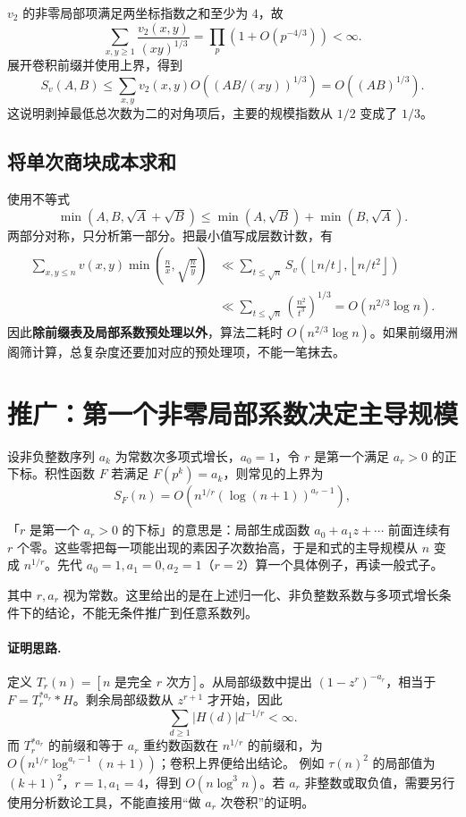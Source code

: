 \documentclass[UTF8,a4paper,11pt,twoside,openright,fontset=fandol]{ctexbook}
\theoremstyle{definition}
\newcommand{\floor}[1]{\left\lfloor #1\right\rfloor}
\begin{document}
$v_2$ 的非零局部项满足两坐标指数之和至少为 $4$，故
\[
 \sum_{x,y\ge1}\frac{v_2(x,y)}{(xy)^{1/3}}
 =\prod_p\left(1+O(p^{-4/3})\right)<\infty.
\]
展开卷积前缀并使用上界，得到
\[
 S_v(A,B)\le\sum_{x,y}v_2(x,y)
 O\!\left((AB/(xy))^{1/3}\right)=O((AB)^{1/3}).
\]
这说明剥掉最低总次数为二的对角项后，主要的规模指数从 $1/2$ 变成了 $1/3$。

\subsection{将单次商块成本求和}
使用不等式
\[
 \min(A,B,\sqrt A+\sqrt B)
 \le\min(A,\sqrt B)+\min(B,\sqrt A).
\]
两部分对称，只分析第一部分。把最小值写成层数计数，有
\[
\begin{aligned}
 \sum_{x,y\le n}v(x,y)\min\left(\frac nx,\sqrt{\frac ny}\right)
 &\ll\sum_{t\le\sqrt n}S_v(\floor{n/t},\floor{n/t^2})\\
 &\ll\sum_{t\le\sqrt n}\left(\frac{n^2}{t^3}\right)^{1/3}
 =O(n^{2/3}\log n).
\end{aligned}
\]
因此\textbf{除前缀表及局部系数预处理以外}，算法二耗时 $O(n^{2/3}\log n)$。如果前缀用洲阁筛计算，总复杂度还要加对应的预处理项，不能一笔抹去。


\section{推广：第一个非零局部系数决定主导规模}
设非负整数序列 $a_k$ 为常数次多项式增长，$a_0=1$，令 $r$ 是第一个满足 $a_r>0$ 的正下标。积性函数 $F$ 若满足 $F(p^k)=a_k$，则常见的上界为
\[
 S_F(n)=O\left(n^{1/r}(\log(n+1))^{a_r-1}\right),
\]

\begin{tip}
「$r$ 是第一个 $a_r>0$ 的下标」的意思是：局部生成函数 $a_0+a_1z+\cdots$ 前面连续有 $r$ 个零。这些零把每一项能出现的素因子次数抬高，于是和式的主导规模从 $n$ 变成 $n^{1/r}$。先代 $a_0=1,a_1=0,a_2=1$（$r=2$）算一个具体例子，再读一般式子。
\end{tip}

其中 $r,a_r$ 视为常数。这里给出的是在上述归一化、非负整数系数与多项式增长条件下的结论，不能无条件推广到任意系数列。

\paragraph{证明思路.} 定义 $T_r(n)=[n\text{ 是完全 }r\text{ 次方}]$。从局部级数中提出 $(1-z^r)^{-a_r}$，相当于 $F=T_r^{*a_r}*H$。剩余局部级数从 $z^{r+1}$ 才开始，因此
\[
 \sum_{d\ge1}|H(d)|d^{-1/r}<\infty.
\]
而 $T_r^{*a_r}$ 的前缀和等于 $a_r$ 重约数函数在 $n^{1/r}$ 的前缀和，为 $O(n^{1/r}\log^{a_r-1}(n+1))$；卷积上界便给出结论。
例如 $\tau(n)^2$ 的局部值为 $(k+1)^2$，$r=1,a_1=4$，得到 $O(n\log^3 n)$。若 $a_r$ 非整数或取负值，需要另行使用分析数论工具，不能直接用“做 $a_r$ 次卷积”的证明。
\end{document}
